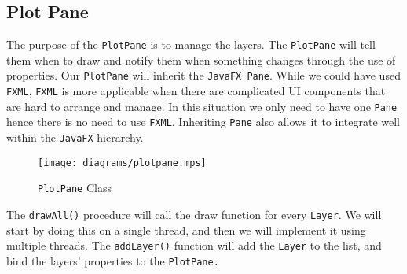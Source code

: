 \documentclass[../../../../../main.tex]{subfiles}
\begin{document}
\subsection{Plot Pane}
The purpose of the \texttt{PlotPane} is to manage the layers. The \texttt{PlotPane} will tell them when to draw and notify them when something changes through the use of properties. Our \texttt{PlotPane} will inherit the \texttt{JavaFX Pane}. While we could have used \texttt{FXML}, \texttt{FXML} is more applicable when there are complicated UI components that are hard to arrange and manage. In this situation we only need to have one \texttt{Pane} hence there is no need to use \texttt{FXML}. Inheriting \texttt{Pane} also allows it to integrate well within the \texttt{JavaFX} hierarchy.

\begin{figure}[H]
	\centering
	\texttt{[image: diagrams/plotpane.mps]}
	\caption{\texttt{PlotPane} Class}
\end{figure}

The \texttt{drawAll()} procedure will call the draw function for every \texttt{Layer}. We will start by doing this on a single thread, and then we will implement it using multiple threads.  The \texttt{addLayer()} function will add the \texttt{Layer} to the list, and bind the layers' properties to the \texttt{PlotPane.}
\newpage
\end{document}
